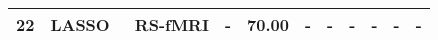 \begin{table*}
\begin{tabular}{l|l|l|l|lllllll}
22                                      & LASSO~\cite{ 2020Generalizable} & RS-fMRI                                               & -                                            & 70.00                        & -                            & -                             & -                          & -                               & -                               & -    \\
\hline

\end{tabular}
\end{table*}

